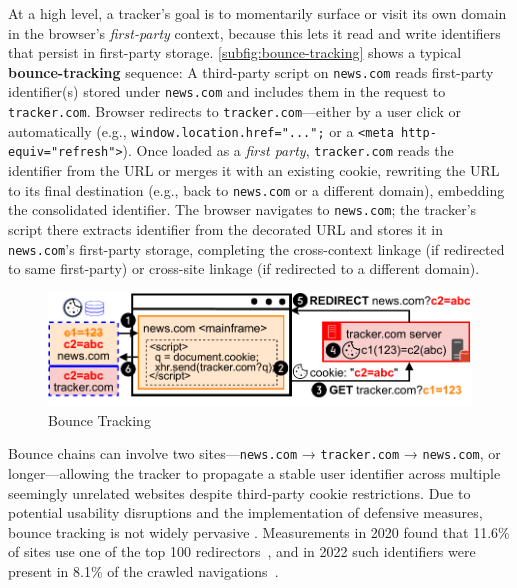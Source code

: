 At a high level, a tracker’s goal is to momentarily surface or visit its own domain in the browser’s \emph{first-party} context, because this lets it read and write identifiers that persist in first-party storage. 
%
\autoref{subfig:bounce-tracking} shows a typical \textbf{bounce-tracking} sequence:
%
 A third-party script on \texttt{news.com} reads first-party identifier(s) stored under \texttt{news.com} and
%
 includes them in the request to \texttt{tracker.com}.
%
 Browser redirects to \texttt{tracker.com}—either by a user click or automatically (e.g., \texttt{window.location.href="...";} or a \texttt{<meta http-equiv="refresh">}).
%
 Once loaded as a \emph{first party}, \texttt{tracker.com} reads the identifier from the URL or merges it with an existing cookie, rewriting the URL to its final destination (e.g., back to \texttt{news.com} or a different domain), embedding the consolidated identifier.
%
 The browser navigates to \texttt{news.com}; the tracker’s script there extracts identifier from the decorated URL and 
%
 stores it in \texttt{news.com}’s first-party storage, completing the cross-context linkage (if redirected to same first-party) or cross-site linkage (if redirected to a different domain).


\begin{figure}[htbp]
    \vspace{-2mm}
    \centering
    \includegraphics[width=1\linewidth]{figures/tracking-mechanisms-bounce-tracking.pdf}
    \caption{Bounce Tracking}
    \label{subfig:bounce-tracking}
    \vspace{-2mm}
\end{figure}

Bounce chains can involve two sites—\texttt{news.com} → \texttt{tracker.com} → \texttt{news.com}, or longer—allowing the tracker to propagate a stable user identifier across multiple seemingly unrelated websites despite third-party cookie restrictions.
%
%
Due to potential usability disruptions and the implementation of defensive measures, bounce tracking is not widely pervasive
\cite{iqbalKhaleesiBreakerAdvertising2022}.
%
Measurements in 2020 found that 11.6\% of sites use one of the top 100 redirectors~\cite{koopInDepthEvaluationRedirect2020}, and in 2022 such identifiers were present in 8.1\% of the crawled navigations~\cite{randallMeasuringUIDSmuggling2022}.


